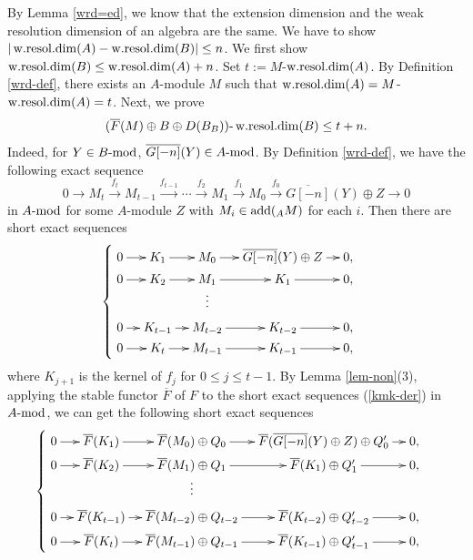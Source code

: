 \documentclass[12pt]{article}
\numberwithin{equation}{section}
\theoremstyle{definition}
\newcommand{\add}{{\rm add}}
\def\wrd{\mathop{\rm w.resol.dim}\nolimits}
\newcommand{\modcat}{\ensuremath{\mbox{{\rm -mod}}}}
\newcommand{\lra}{\longrightarrow}
\newcommand{\lraf}[1]{\stackrel{#1}{\lra}}
\begin{document}
By Lemma \ref{wrd=ed}, we know that the extension dimension and the weak resolution dimension of an algebra are the same. We have to show $|\wrd(A)-\wrd(B)|\le n$. We first show $\wrd(B)\le \wrd(A)+ n$. Set $t:=M$-$\wrd(A)$. By Definition \ref{wrd-def}, there exists an $A$-module $M$ such that $\wrd(A)=M$-$\wrd(A)=t$.
Next, we prove $$(\overline{F}(M)\oplus B\oplus D(B_B))\mbox{-}\wrd(B)\le t+n.$$ Indeed, for $Y\in B\modcat$, $\overline{G[-n]}(Y)\in A\modcat$.
By Definition \ref{wrd-def}, we have the following exact sequence
$$0 \lra M_{t}\lraf{f_t} M_{t-1}\lraf{f_{t-1}} \cdots \lraf{f_2} M_{1} \lraf{f_1} M_{0}\lraf{f_0} \overline{G[-n]}(Y)\oplus Z\lra 0$$
in $A\modcat$ for some $A$-module $Z$ with $M_i\in \add(_AM)$ for each $i$. Then there are short exact sequences
\begin{equation}\label{kmk-der}
\begin{cases}
\xymatrix@C=1em@R=0.1em{
0\ar[r]& K_{1} \ar[r]& M_0\ar[r]& \overline{G[-n]}(Y)\oplus Z \ar[r]& 0,\\
0\ar[r]& K_{2} \ar[r]& M_1\ar[r]& K_1 \ar[r]& 0,\\
&&\vdots&&\\
0\ar[r]& K_{t-1} \ar[r]& M_{t-2}\ar[r]& K_{t-2} \ar[r]& 0,\\
0\ar[r]& K_{t} \ar[r]& M_{t-1}\ar[r]& K_{t-1} \ar[r]& 0,}
\end{cases}
\end{equation}
where $K_{j+1}$ is the kernel of $f_j$ for $0\le j\le t-1$. By Lemma \ref{lem-non}(3), applying the stable functor $\overline{F}$ of $F$ to the short exact sequences (\ref{kmk-der}) in $A\modcat$, we can get the following short exact sequences
\begin{equation}\label{fkmk-der}
\begin{cases}
\xymatrix@C=1em@R=0.1em{
0\ar[r]& \overline{F}(K_{1}) \ar[r]& \overline{F}(M_0)\oplus Q_0\ar[r]& \overline{F}(\overline{G[-n]}(Y)\oplus Z )\oplus Q_0' \ar[r]& 0,\\
0\ar[r]& \overline{F}(K_{2}) \ar[r]& \overline{F}(M_1)\oplus Q_1\ar[r]& \overline{F}(K_1)\oplus Q_1' \ar[r]& 0,\\
&&\vdots&&\\
0\ar[r]& \overline{F}(K_{t-1}) \ar[r]& \overline{F}(M_{t-2})\oplus Q_{t-2}\ar[r]& \overline{F}(K_{t-2})\oplus Q_{t-2}'\ar[r]& 0,\\
0\ar[r]& \overline{F}(K_{t}) \ar[r]& \overline{F}(M_{t-1})\oplus Q_{t-1}\ar[r]& \overline{F}(K_{t-1})\oplus Q_{t-1}'\ar[r]& 0,}
\end{cases}
\end{equation}
\end{document}
